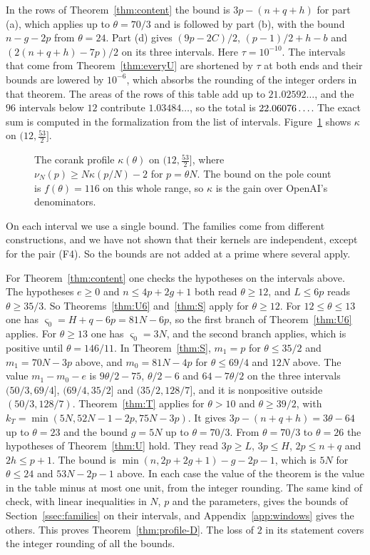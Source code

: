 In the rows of Theorem~\ref{thm:content} the bound is $3p-(n+q+h)$ for part (a), which applies up to $\theta=70/3$ and is followed by part (b), with the bound
$n-g-2p$ from $\theta=24$. Part (d) gives $(9p-2C)/2$, $(p-1)/2+h-b$ and $(2(n+q+h)-7p)/2$ on its three intervals. Here $\tau=10^{-10}$. The intervals that come from Theorem~\ref{thm:everyU} are shortened by $\tau$ at both ends
and their bounds are lowered by $10^{-6}$, which absorbs the rounding of the integer orders in that theorem.
The areas of the rows of this table add up to $21.02592\ldots$, and the $96$ intervals below $12$
contribute $1.03484\ldots$, so the total is $22.06076\ldots$. The exact sum is computed in the formalization
from the list of intervals. Figure~\ref{fig:corank} shows $\kappa$ on $(12,\frac{53}2]$.

\begin{figure}[ht]
\centering

\caption{The corank profile $\kappa(\theta)$ on $(12,\frac{53}2]$, where $\nu_N(p)\ge N\kappa(p/N)-2$ for
$p=\theta N$. The bound on the pole count is $f(\theta)=116$ on this whole range, so $\kappa$ is the gain over
OpenAI's denominators.}\label{fig:corank}
\end{figure}

On each interval we use a single bound. The families come from different constructions, and we have not
shown that their kernels are independent, except for the pair (F4). So the bounds are not added at a prime
where several apply.

For Theorem~\ref{thm:content} one checks the hypotheses on the intervals above. The hypotheses $e\ge0$ and
$n\le4p+2g+1$ both read $\theta\ge12$, and $L\le6p$ reads $\theta\ge35/3$. So Theorems~\ref{thm:U6}
and~\ref{thm:S} apply for $\theta\ge12$. For $12\le\theta\le13$ one has $\varsigma_0=H+q-6p=81N-6p$, so the
first branch of Theorem~\ref{thm:U6} applies. For $\theta\ge13$ one has $\varsigma_0=3N$, and the second
branch applies, which is positive until $\theta=146/11$. In Theorem~\ref{thm:S}, $m_1=p$ for $\theta\le35/2$ and
$m_1=70N-3p$ above, and $m_0=81N-4p$ for $\theta\le69/4$ and $12N$ above. The value $m_1-m_0-e$ is
$9\theta/2-75$, $\theta/2-6$ and $64-7\theta/2$ on the three intervals $(50/3,69/4]$, $(69/4,35/2]$ and
$(35/2,128/7]$, and it is nonpositive outside $(50/3,128/7)$. Theorem~\ref{thm:T} applies for $\theta>10$ and
$\theta\ge39/2$, with $k_T=\min(5N,52N-1-2p,75N-3p)$. It gives $3p-(n+q+h)=3\theta-64$ up to $\theta=23$ and
the bound $g=5N$ up to $\theta=70/3$. From $\theta=70/3$ to $\theta=26$ the hypotheses of Theorem~\ref{thm:U}
hold. They read $3p\ge L$, $3p\le H$, $2p\le n+q$ and $2h\le p+1$. The bound is $\min(n,2p+2g+1)-g-2p-1$,
which is $5N$ for $\theta\le24$ and $53N-2p-1$ above. In each case the value of the theorem is the value in
the table minus at most one unit, from the integer rounding. The same kind of check, with linear
inequalities in $N$, $p$ and the parameters, gives the bounds of Section~\ref{ssec:families} on their
intervals, and Appendix~\ref{app:windows} gives the others. This proves Theorem~\ref{thm:profile-D}. The loss
of $2$ in its statement covers the integer rounding of all the bounds.
